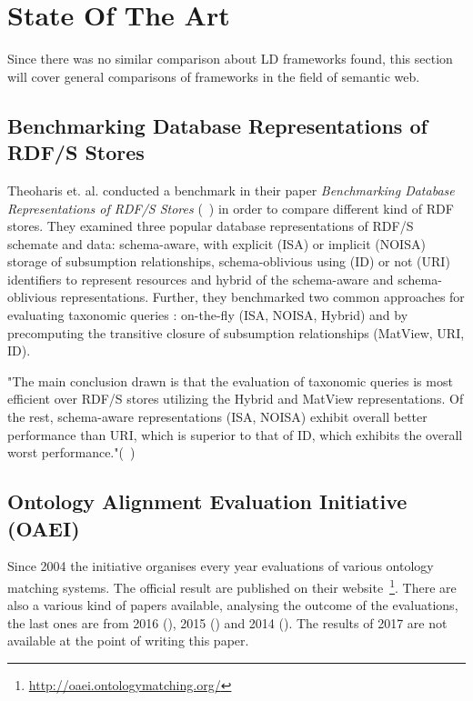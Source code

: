 \chapter{State Of The Art}

Since there was no similar comparison about LD frameworks found, this section will cover general comparisons of frameworks in the field of semantic web.

\section{Benchmarking Database Representations of RDF/S Stores}

Theoharis et. al. conducted a benchmark in their paper \emph{Benchmarking Database Representations of RDF/S Stores} (~\cite{theoharis2005benchmarking}) in order to compare different kind of RDF stores. They examined three popular database representations of RDF/S schemate and data: schema-aware, with explicit (ISA) or implicit (NOISA) storage of subsumption relationships, schema-oblivious using (ID) or not (URI) identifiers to represent resources and hybrid of the schema-aware and schema-oblivious representations. Further, they benchmarked two common approaches for evaluating taxonomic queries : on-the-fly (ISA, NOISA, Hybrid) and by precomputing the transitive closure of subsumption relationships (MatView, URI, ID). 

"The main conclusion drawn is that the evaluation of taxonomic queries is most efficient over RDF/S stores utilizing the Hybrid and MatView representations. Of the rest, schema-aware representations (ISA, NOISA) exhibit overall better performance than URI, which is superior to that of ID, which exhibits the overall worst performance."(~\cite{theoharis2005benchmarking})

\section{Ontology Alignment Evaluation Initiative (OAEI)}

Since 2004 the initiative organises every year evaluations of various ontology matching systems. The official result are published on their website~\footnote{\url{http://oaei.ontologymatching.org/}}. There are also a various kind of papers available, analysing the outcome of the evaluations, the last ones are from 2016 (\cite{achichi2016results}), 2015 (\cite{cheatham2015results}) and 2014 (\cite{dragisic2014results}). The results of 2017 are not available at the point of writing this paper.


